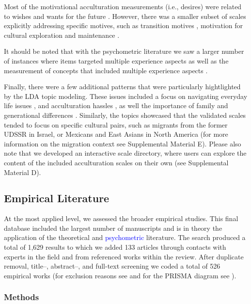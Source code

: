 Most of the motivational acculturation measurements (i.e., desires) were
related to wishes and wants for the future
\citep[e.g.,][]{Mancini2014, Ben-Shalom2003}. However, there was a
smaller subset of scales explicitly addressing specific motives, such as
transition motives \citep[][]{Mchitarjan2015}, motivation for cultural
exploration and maintenance \citep[][]{Recker2017}.

It should be noted that with the psychometric literature we saw a larger
number of instances where items targeted multiple experience aspects
\citep[e.g., enjoyment of wearing traditional clothing,][]{Ozer2016} as
well as the measurement of concepts that included multiple experience
aspects \citep[e.g., satisfaction,][]{Cuellar1995a}.

Finally, there were a few additional patterns that were particularly
hightlighted by the LDA topic modeling. These issues included a focus on
navigating everyday life issues \citep[e.g.,][]{Harder2018}, and
acculturation hassles \citep[e.g.,][]{Vinokurov2002}, as well the
importance of family and generational differences
\citep[e.g.,][]{ICSEYteam2006, Lee2004b}. Similarly, the topics
showcased that the validated scales tended to focus on specific cultural
pairs, such as migrants from the former UDSSR in Israel, or Mexicans and
East Asians in North America (for more information on the migration
context see Supplemental Material E). Please also note that we developed
an interactive scale directory, where users can explore the content of
the included acculturation scales on their own (see Supplemental
Material D). \color{black}

\subsection{Empirical Literature}

At the most applied level, we assessed the broader empirical studies.
This final database included the largest number of manuscripts and is in
theory the application of the theoretical and
\textcolor{blue}{psychometric} literature. The search produced a total
of 1,629 results to which we added 133 articles through contacts with
experts in the field and from referenced works within the review. After
duplicate removal, title--, abstract--, and full-text screening we coded
a total of 526 empirical works (for exclusion reasons see
 and for the PRISMA diagram see
).

\subsubsection{Methods}

